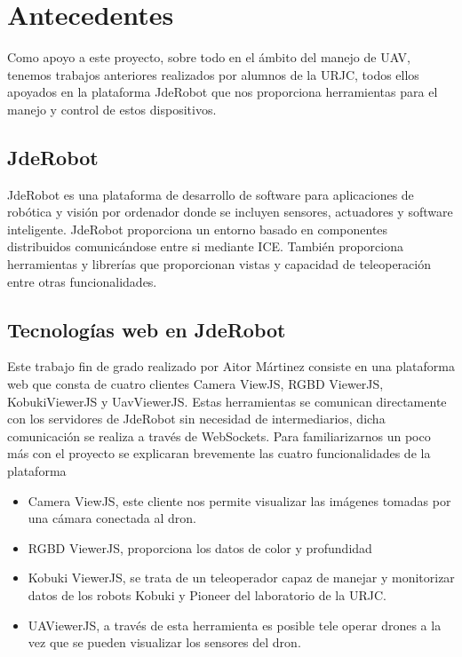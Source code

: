 \section{Antecedentes}

Como apoyo a este proyecto, sobre todo en el ámbito del manejo de UAV, tenemos trabajos anteriores realizados por alumnos de la URJC, todos ellos apoyados en la plataforma JdeRobot que nos proporciona herramientas para el manejo y control de estos dispositivos.

\subsection{JdeRobot}

JdeRobot es una plataforma de desarrollo de software para aplicaciones de robótica y visión por ordenador donde se incluyen sensores, actuadores y software inteligente. JdeRobot proporciona un entorno basado en componentes distribuidos comunicándose entre si mediante ICE.  También proporciona herramientas y librerías que proporcionan vistas y capacidad de teleoperación entre otras funcionalidades.

\subsection{Tecnologías web en JdeRobot}

Este trabajo fin de grado realizado por Aitor Mártinez consiste en una plataforma web que consta de cuatro clientes Camera ViewJS, RGBD ViewerJS,  KobukiViewerJS  y  UavViewerJS. Estas herramientas se comunican directamente con los servidores de JdeRobot sin necesidad de intermediarios, dicha comunicación se realiza a través  de WebSockets. Para familiarizarnos un poco más con el proyecto se explicaran brevemente las cuatro funcionalidades de la plataforma

\begin{itemize}
    \item Camera ViewJS, este cliente nos permite visualizar las imágenes tomadas por una cámara conectada al dron.
    \item RGBD ViewerJS, proporciona los datos de color y profundidad
    \item Kobuki ViewerJS, se trata de un teleoperador capaz de manejar y monitorizar datos de los robots Kobuki y Pioneer del laboratorio de la URJC.
    \item UAViewerJS, a través de esta herramienta es posible tele operar drones a la vez que se pueden visualizar los sensores del dron.
\end{itemize}

